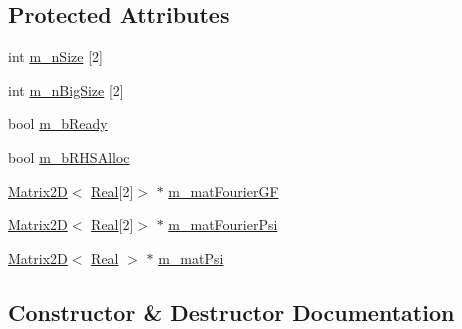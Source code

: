 \subsection*{Protected Attributes}
\begin{DoxyCompactItemize}
\item 
int \hyperlink{class_velocity_solver___unbounded_a5a06247f4313780a5cb906d64bcd8f80}{m\+\_\+n\+Size} \mbox{[}2\mbox{]}
\item 
int \hyperlink{class_velocity_solver___unbounded_a8ef48a7fe2c413d388a5145a37716452}{m\+\_\+n\+Big\+Size} \mbox{[}2\mbox{]}
\item 
bool \hyperlink{class_velocity_solver___unbounded_ab4e11619c97d2ebfe551bed262118ab9}{m\+\_\+b\+Ready}
\item 
bool \hyperlink{class_velocity_solver___unbounded_a83aaa5f4615df58cfe939d661075f959}{m\+\_\+b\+R\+H\+S\+Alloc}
\item 
\hyperlink{class_matrix2_d}{Matrix2\+D}$<$ \hyperlink{_h_d_f5_dumper_8h_a445a5f0e2a34c9d97d69a3c2d1957907}{Real}\mbox{[}2\mbox{]}$>$ $\ast$ \hyperlink{class_velocity_solver___unbounded_a11158418be011c0978f050fd74a04482}{m\+\_\+mat\+Fourier\+G\+F}
\item 
\hyperlink{class_matrix2_d}{Matrix2\+D}$<$ \hyperlink{_h_d_f5_dumper_8h_a445a5f0e2a34c9d97d69a3c2d1957907}{Real}\mbox{[}2\mbox{]}$>$ $\ast$ \hyperlink{class_velocity_solver___unbounded_afcbee94365c2da82320e79181c8387b2}{m\+\_\+mat\+Fourier\+Psi}
\item 
\hyperlink{class_matrix2_d}{Matrix2\+D}$<$ \hyperlink{_h_d_f5_dumper_8h_a445a5f0e2a34c9d97d69a3c2d1957907}{Real} $>$ $\ast$ \hyperlink{class_velocity_solver___unbounded_afa889bd25dd44eb07f9aab6b0b0cd840}{m\+\_\+mat\+Psi}
\end{DoxyCompactItemize}


\subsection{Constructor \& Destructor Documentation}
\hypertarget{class_velocity_solver___unbounded_a2a4f55337c05bd3e5a98d732d4524031}{}
